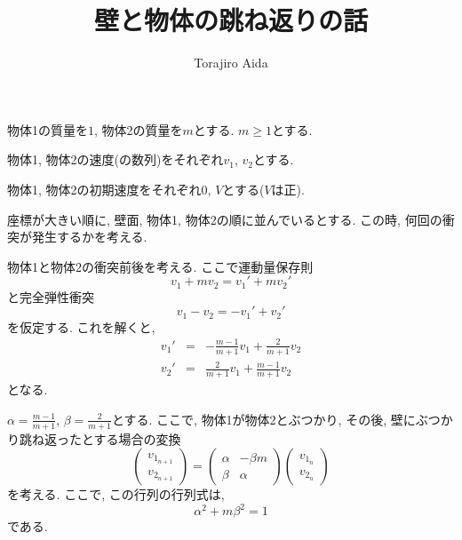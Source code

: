 \documentclass[lualatex,a5paper,ja=standard]{bxjsarticle}
\title{壁と物体の跳ね返りの話}
\author{Torajiro Aida}
\begin{document}
\maketitle


物体1の質量を$1$, 物体2の質量を$m$とする. $m \ge 1$とする.

物体1, 物体2の速度(の数列)をそれぞれ$v_1$, $v_2$とする.

物体1, 物体2の初期速度をそれぞれ$0$, $V$とする($V$は正).

座標が大きい順に, 壁面, 物体1, 物体2の順に並んでいるとする. この時, 何回の衝突が発生するかを考える.

物体1と物体2の衝突前後を考える. ここで運動量保存則
\begin{equation}
    v_1 + m v_2 = v_1' + m v_2'\label{pp}
\end{equation}
と完全弾性衝突
\begin{equation}
    v_1 - v_2 = -v_1' + v_2' \label{ep}
\end{equation}を仮定する. これを解くと, 
\begin{eqnarray}
    v_1' &=& -\frac{m-1}{m+1}v_1 + \frac{2}{m+1} v_2 \\
    v_2' &=& \frac{2}{m+1} v_1 + \frac{m-1}{m+1} v_2
\end{eqnarray}
となる.

$\alpha = \frac{m-1}{m+1}$, $\beta = \frac{2}{m+1}$とする.
ここで, 物体1が物体2とぶつかり, その後, 壁にぶつかり跳ね返ったとする場合の変換
\begin{equation}
\begin{pmatrix}
    v_{1_{n+1}}\\
    v_{2_{n+1}}
\end{pmatrix}
    =
\begin{pmatrix}
    \alpha & -\beta m\\
    \beta & \alpha
\end{pmatrix}
\begin{pmatrix}
    v_{1_{n}}\\
    v_{2_{n}}
\end{pmatrix}
\end{equation}
を考える. ここで, この行列の行列式は, 
\begin{equation}
    \alpha^2 + m\beta^2 = 1  \label{det}
\end{equation}
である.
\end{document}

